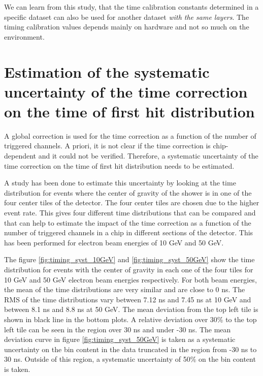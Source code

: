 We can learn from this study, that the time calibration constants determined in a specific dataset can also be used for another dataset \textit{with the same layers}. The timing calibration values depends mainly on hardware and not so much on the environment.

\section{Estimation of the systematic uncertainty of the time correction on the time of first hit distribution}
\label{subsec:Systematic_Correction}

A global correction is used for the time correction as a function of the number of triggered channels. A priori, it is not clear if the time correction is chip-dependent and it could not be verified. Therefore, a systematic uncertainty of the time correction on the time of first hit distribution needs to be estimated.

A study has been done to estimate this uncertainty by looking at the time distribution for events where the center of gravity of the shower is in one of the four center tiles of the detector. The four center tiles are chosen due to the higher event rate. This gives four different time distributions that can be compared and that can help to estimate the impact of the time correction as a function of the number of triggered channels in a chip in different sections of the detector. This has been performed for electron beam energies of 10 GeV and 50 GeV.

The figure \ref{fig:timing_syst_10GeV} and \ref{fig:timing_syst_50GeV} show the time distribution for events with the center of gravity in each one of the four tiles for 10 GeV and 50 GeV electron beam energies respectively. For both beam energies, the mean of the time distributions are very similar and are close to 0 ns. The RMS of the time distributions vary between 7.12 ns and 7.45 ns at 10 GeV and between 8.1 ns and 8.8 ns at 50 GeV. The mean deviation from the top left tile is shown in black line in the bottom plots. A relative deviation over 30\% to the top left tile can be seen in the region over 30 ns and under -30 ns. The mean deviation curve in figure \ref{fig:timing_syst_50GeV} is taken as a systematic uncertainty on the bin content in the data truncated in the region from -30 ns to 30 ns. Outside of this region, a systematic uncertainty of 50\% on the bin content is taken.

